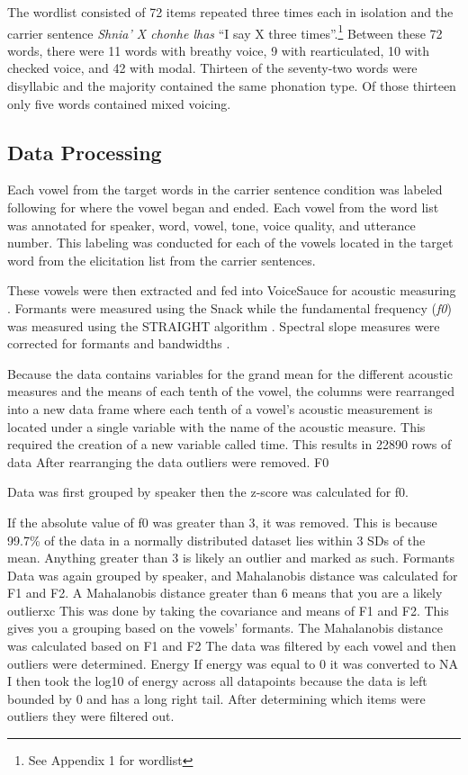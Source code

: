 \documentclass[12pt, letterpaper]{article}
\begin{document}
The wordlist consisted of 72 items repeated three times each in isolation and the carrier sentence \textit{Shnia' X chonhe lhas} ``I say X three times''.\footnote{See Appendix 1 for wordlist} Between these 72 words, there were 11 words with breathy voice, 9 with rearticulated, 10 with checked voice, and 42 with modal. Thirteen of the seventy-two words were disyllabic and the majority contained the same phonation type. Of those thirteen only five words contained mixed voicing.

\subsection{Data Processing} \label{sec:Processing}

Each vowel from the target words in the carrier sentence condition was labeled following \citet{garellekAcousticDiscriminabilityComplex2020} for where the vowel began and ended. Each vowel from the word list was annotated for speaker, word, vowel, tone, voice quality, and utterance number. This labeling was conducted for each of the vowels located in the target word from the elicitation list from the carrier sentences.

These vowels were then extracted and fed into VoiceSauce for acoustic measuring \citep{shueVOICESAUCEProgramVoice2009}. Formants were measured using the Snack \citep{sjolanderSnackSoundToolkit2004} while the fundamental frequency (\textit{f0}) was measured using the STRAIGHT algorithm \citep{kawaharaInstantaneousfrequencybasedPitchExtraction1998}. Spectral slope measures were corrected for formants and bandwidths \citep{hansonGlottalCharacteristicsFemale1997,iseliAgeSexVowel2007}.

Because the data contains variables for the grand mean for the different acoustic measures and the means of each tenth of the vowel, the columns were rearranged into a new data frame where each tenth of a vowel’s acoustic measurement is located under a single variable with the name of the acoustic measure. 
This required the creation of a new variable called time. 
This results in 22890 rows of data
After rearranging the data outliers were removed. 
F0

Data was first grouped by speaker then the z-score was calculated for f0. 

If the absolute value of f0 was greater than 3, it was removed. This is because 99.7\% of the data in a normally distributed dataset lies within 3 SDs of the mean. Anything greater than 3 is likely an outlier and marked as such.
Formants
Data was again grouped by speaker, and Mahalanobis distance was calculated for F1 and F2. 
A Mahalanobis distance greater than 6 means that you are a likely outlierxc
This was done by taking the covariance and means of F1 and F2. This gives you a grouping based on the vowels’ formants. 
The Mahalanobis distance was calculated based on F1 and F2
The data was filtered by each vowel and then outliers were determined. 
Energy
If energy was equal to 0 it was converted to NA
I then took the log10  of energy across all datapoints because the data is left bounded by 0 and has a long right tail. 
After determining which items were outliers they were filtered out.
\end{document}
